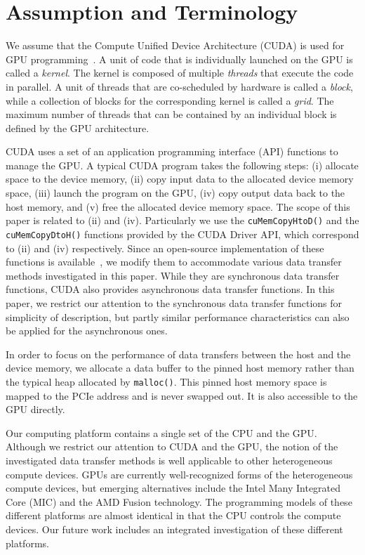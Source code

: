 \section{Assumption and Terminology}
\label{sec:assumption}

We assume that the Compute Unified Device Architecture (CUDA) is used
for GPU programming~\cite{NVIDIA_CUDA}.
A unit of code that is individually launched on the GPU is called
a \textit{kernel}.
The kernel is composed of multiple \textit{threads} that execute the
code in parallel.
A unit of threads that are co-scheduled by hardware is called a
\textit{block}, while a collection of blocks for the corresponding
kernel is called a \textit{grid}.  
The maximum number of threads that can be contained by an individual
block is defined by the GPU architecture.

CUDA uses a set of an application programming interface (API) functions
to manage the GPU.
A typical CUDA program takes the following steps: (i) allocate space
to the device memory, (ii) copy input data to the allocated device memory
space, (iii) launch the program on the GPU, (iv) copy output data back
to the host memory, and (v) free the allocated device memory space. 
The scope of this paper is related to (ii) and (iv).
Particularly we use the \texttt{cuMemCopyHtoD()} and the
\texttt{cuMemCopyDtoH()} functions provided by the CUDA Driver API,
which correspond to (ii) and (iv) respectively.
Since an open-source implementation of these functions is
available~\cite{Kato_ATC12}, we modify them to accommodate various data
transfer methods investigated in this paper.
While they are synchronous data transfer functions, CUDA also provides
asynchronous data transfer functions.
In this paper, we restrict our attention to the synchronous data
transfer functions for simplicity of description, but partly similar
performance characteristics can also be applied for the asynchronous
ones.

In order to focus on the performance of data transfers between the host
and the device memory, we allocate a data buffer to the pinned host
memory rather than the typical heap allocated by \texttt{malloc()}.
This pinned host memory space is mapped to the PCIe address and is never
swapped out.
It is also accessible to the GPU directly.

Our computing platform contains a single set of the CPU and the GPU.
Although we restrict our attention to CUDA and the GPU, the notion of
the investigated data transfer methods is well applicable to other
heterogeneous compute devices.
GPUs are currently well-recognized forms of the heterogeneous compute
devices, but emerging alternatives include the Intel Many Integrated
Core (MIC) and the AMD Fusion technology.
The programming models of these different platforms are almost identical
in that the CPU controls the compute devices.
Our future work includes an integrated investigation of these different
platforms.

